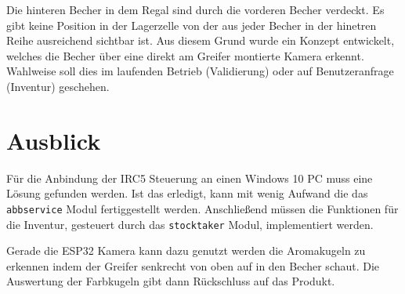 Die hinteren Becher in dem Regal sind durch die vorderen Becher verdeckt. Es gibt keine Position in der Lagerzelle von der aus jeder Becher in der
hinetren Reihe ausreichend sichtbar ist. 
Aus diesem Grund wurde ein Konzept entwickelt, welches die Becher über eine direkt am Greifer montierte Kamera erkennt.
Wahlweise soll dies im laufenden Betrieb (Validierung) oder auf Benutzeranfrage (Inventur) geschehen.  

\section{Ausblick}

Für die Anbindung der IRC5 Steuerung an einen Windows 10 PC muss eine Lösung gefunden werden. 
Ist das erledigt, kann mit wenig Aufwand die das \verb|abbservice| Modul fertiggestellt werden. 
Anschließend müssen die Funktionen für die Inventur, gesteuert durch das \verb|stocktaker| Modul, implementiert werden.

Gerade die ESP32 Kamera kann dazu genutzt werden die Aromakugeln zu erkennen indem der Greifer senkrecht von oben auf in den Becher schaut.
Die Auswertung der Farbkugeln gibt dann Rückschluss auf das Produkt.

